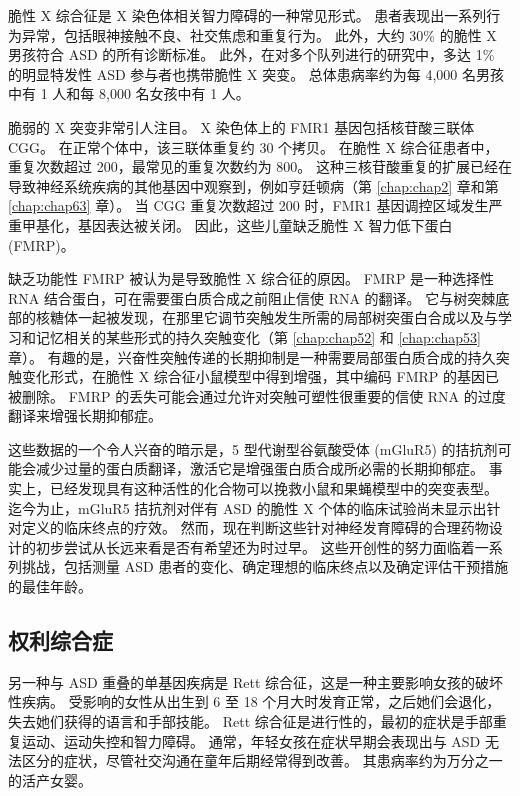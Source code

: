 脆性 X 综合征是 X 染色体相关智力障碍的一种常见形式。
患者表现出一系列行为异常，包括眼神接触不良、社交焦虑和重复行为。
此外，大约 30\% 的脆性 X 男孩符合 ASD 的所有诊断标准。
此外，在对多个队列进行的研究中，多达 1\% 的明显特发性 ASD 参与者也携带脆性 X 突变。
总体患病率约为每 4,000 名男孩中有 1 人和每 8,000 名女孩中有 1 人。


脆弱的 X 突变非常引人注目。
X 染色体上的 FMR1 基因包括核苷酸三联体 CGG。
在正常个体中，该三联体重复约 30 个拷贝。
在脆性 X 综合征患者中，重复次数超过 200，最常见的重复次数约为 800。
这种三核苷酸重复的扩展已经在导致神经系统疾病的其他基因中观察到，例如亨廷顿病（第 \ref{chap:chap2} 章和第 \ref{chap:chap63} 章）。
当 CGG 重复次数超过 200 时，FMR1 基因调控区域发生严重甲基化，基因表达被关闭。
因此，这些儿童缺乏脆性 X 智力低下蛋白 (FMRP)。


缺乏功能性 FMRP 被认为是导致脆性 X 综合征的原因。
FMRP 是一种选择性 RNA 结合蛋白，可在需要蛋白质合成之前阻止信使 RNA 的翻译。
它与树突棘底部的核糖体一起被发现，在那里它调节突触发生所需的局部树突蛋白合成以及与学习和记忆相关的某些形式的持久突触变化（第 \ref{chap:chap52} 和 \ref{chap:chap53} 章）。
有趣的是，兴奋性突触传递的长期抑制是一种需要局部蛋白质合成的持久突触变化形式，在脆性 X 综合征小鼠模型中得到增强，其中编码 FMRP 的基因已被删除。
FMRP 的丢失可能会通过允许对突触可塑性很重要的信使 RNA 的过度翻译来增强长期抑郁症。


这些数据的一个令人兴奋的暗示是，5 型代谢型谷氨酸受体 (mGluR5) 的拮抗剂可能会减少过量的蛋白质翻译，激活它是增强蛋白质合成所必需的长期抑郁症。
事实上，已经发现具有这种活性的化合物可以挽救小鼠和果蝇模型中的突变表型。
迄今为止，mGluR5 拮抗剂对伴有 ASD 的脆性 X 个体的临床试验尚未显示出针对定义的临床终点的疗效。
然而，现在判断这些针对神经发育障碍的合理药物设计的初步尝试从长远来看是否有希望还为时过早。
这些开创性的努力面临着一系列挑战，包括测量 ASD 患者的变化、确定理想的临床终点以及确定评估干预措施的最佳年龄。



\subsection{权利综合症}

另一种与 ASD 重叠的单基因疾病是 Rett 综合征，这是一种主要影响女孩的破坏性疾病。
受影响的女性从出生到 6 至 18 个月大时发育正常，之后她们会退化，失去她们获得的语言和手部技能。
Rett 综合征是进行性的，最初的症状是手部重复运动、运动失控和智力障碍。
通常，年轻女孩在症状早期会表现出与 ASD 无法区分的症状，尽管社交沟通在童年后期经常得到改善。
其患病率约为万分之一的活产女婴。


